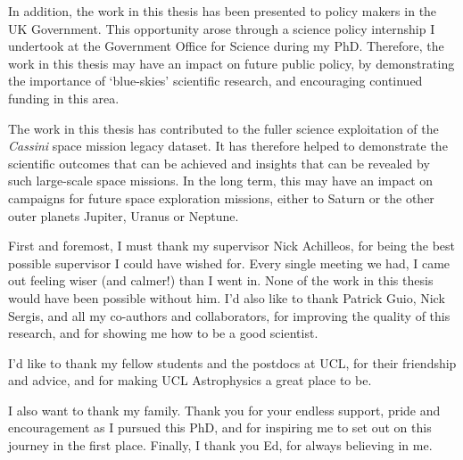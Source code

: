 \begin{impactstatement}
In addition, the work in this thesis has been presented to policy makers in the UK Government. This opportunity arose through a science policy internship I undertook at the Government Office for Science during my PhD. Therefore, the work in this thesis may have an impact on future public policy, by demonstrating the importance of `blue-skies’ scientific research, and encouraging continued funding in this area.

The work in this thesis has contributed to the fuller science exploitation of the \textit{Cassini} space mission legacy dataset. It has therefore helped to demonstrate the scientific outcomes that can be achieved and insights that can be revealed by such large-scale space missions. In the long term, this may have an impact on campaigns for future space exploration missions, either to Saturn or the other outer planets Jupiter, Uranus or Neptune.

\end{impactstatement}

\begin{acknowledgements}
First and foremost, I must thank my supervisor Nick Achilleos, for being the best possible supervisor I could have wished for. Every single meeting we had, I came out feeling wiser (and calmer!) than I went in. None of the work in this thesis would have been possible without him. I'd also like to thank Patrick Guio, Nick Sergis, and all my co-authors and collaborators, for improving the quality of this research, and for showing me how to be a good scientist.

I'd like to thank my fellow students and the postdocs at UCL, for their friendship and advice, and for making UCL Astrophysics a great place to  be.

I also want to thank my family. Thank you for your endless support, pride and encouragement as I pursued this PhD, and for inspiring me to set out on this journey in the first place. Finally, I thank you Ed, for always believing in me.
\end{acknowledgements}

\setcounter{tocdepth}{2} 

\tableofcontents

\cleardoublepage %
{}

\listoffigures

\cleardoublepage %
{}

\listoftables

